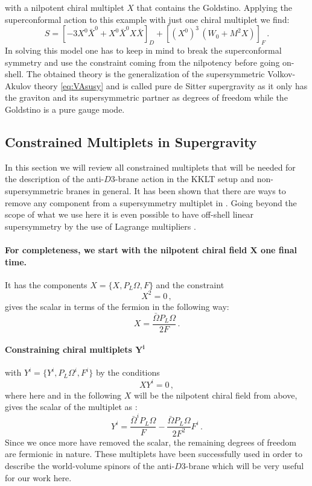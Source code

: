 \documentclass[a4paper,12pt]{report}
\newcommand{\be}{\begin{equation}}
\newcommand{\ee}{\end{equation}}
\begin{document}
with a nilpotent chiral multiplet $X$ that contains the Goldstino. Applying the superconformal action to this example with just one chiral multiplet we find:
\be 
S = \left[-3 X^0 \bar{X}^0 + X^0 \bar{X}^0 X\bar{X}\right]_D + \left[ (X^0)^3\, (W_0 + M^2 X) \right]_F\,.
\ee
In solving this model one has to keep in mind to break the superconformal symmetry and use the constraint coming from the nilpotency before going on-shell. The obtained theory is the generalization of the supersymmetric Volkov-Akulov theory \eqref{eq:VAsusy} and is called pure de Sitter supergravity \cite{Farakos:2013ih,Dudas:2015eha,Bergshoeff:2015tra,Hasegawa:2015bza,Ferrara:2015gta} as it only has the graviton and its supersymmetric partner as degrees of freedom while the Goldstino is a pure gauge mode.
\subsection{Constrained Multiplets in Supergravity}
\label{sec:constmult}
In this section we will review all constrained multiplets that will be needed for the description of the anti-$D3$-brane action in the KKLT setup and non-supersymmetric branes in general. It has been shown that there are ways to remove any component from a supersymmetry multiplet in \cite{DallAgata:2016syy}. Going beyond the scope of what we use here it is even possible to have off-shell linear supersymmetry by the use of Lagrange multipliers \cite{Ferrara:2016een}. 
\paragraph{For completeness, we start with the nilpotent chiral field $\mathbf{X}$ one final time.} It has the components $X = \{X,P_L \Omega, F\}$ and the constraint
\be 
X^2 = 0\,,
\ee
gives the scalar in terms of the fermion in the following way:
\be 
X = \frac{\bar{\Omega}P_L \Omega}{2F}\,.
\label{eq:nilconst}
\ee
\paragraph{Constraining chiral multiplets $\mathbf{Y^i}$} with $Y^i = \{Y^i, P_L \Omega^i,F^i\}$ by the conditions
\be 
X Y^i =0\,,
\ee
where here and in the following $X$ will be the nilpotent chiral field from above, gives the scalar of the multiplet as \cite{Brignole:1997pe,DallAgata:2015pdd}:
\be 
Y^i=\frac{\bar{\Omega}^i P_L\Omega}{F}-\frac{\bar{\Omega}P_L \Omega}{2F^2}F^i\,.
\ee
Since we once more have removed the scalar, the remaining degrees of freedom are fermionic in nature. These multiplets have been successfully used in order to describe the world-volume spinors of the anti-$D3$-brane \cite{Vercnocke:2016fbt,Kallosh:2016aep} which will be very useful for our work here.
\end{document}
